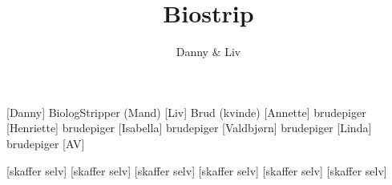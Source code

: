 \documentclass[a4paper,11pt]{article}
\title{Biostrip}
\author{Danny \& Liv}
\begin{document}
\maketitle

\begin{roles}
	[Danny] BiologStripper (Mand)
	[Liv] Brud (kvinde)
	[Annette] brudepiger
	[Henriette] brudepiger
	[Isabella] brudepiger
	[Valdbjørn] brudepiger
	[Linda] brudepiger
	[AV]
\end{roles}

\begin{props}
	[skaffer selv]
	[skaffer selv]
	[skaffer selv]
	[skaffer selv]
	[skaffer selv]
	[skaffer selv]
\end{props}
\end{document}

